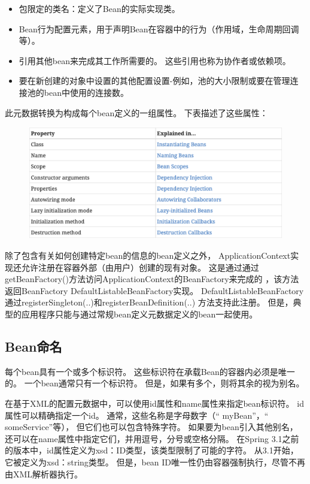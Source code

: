 \begin{itemize}
    \item 包限定的类名：定义了Bean的实际实现类。
    \item Bean行为配置元素，用于声明Bean在容器中的行为（作用域，生命周期回调等）。
    \item 引用其他bean来完成其工作所需要的。 这些引用也称为协作者或依赖项。
    \item 要在新创建的对象中设置的其他配置设置-例如，池的大小限制或要在管理连接池的bean中使用的连接数。
\end{itemize}

此元数据转换为构成每个bean定义的一组属性。 下表描述了这些属性：

\begin{figure}[ht]
    \centering
    \includegraphics[width=1\linewidth]{./Figure/IMG_bean_def.png}
\end{figure}

除了包含有关如何创建特定bean的信息的bean定义之外，
ApplicationContext实现还允许注册在容器外部（由用户）创建的现有对象。
这是通过通过getBeanFactory()方法访问ApplicationContext的BeanFactory来完成的
，该方法返回BeanFactory DefaultListableBeanFactory实现。
DefaultListableBeanFactory通过registerSingleton(..)和registerBeanDefinition(..)
方法支持此注册。 但是，典型的应用程序只能与通过常规bean定义元数据定义的bean一起使用。

\subsection{Bean命名}

每个bean具有一个或多个标识符。 这些标识符在承载Bean的容器内必须是唯一的。 
一个bean通常只有一个标识符。 
但是，如果有多个，则将其余的视为别名。

在基于XML的配置元数据中，可以使用id属性和name属性来指定bean标识符。
id属性可以精确指定一个id。 
通常，这些名称是字母数字（“ myBean”，“ someService”等），
但它们也可以包含特殊字符。 如果要为bean引入其他别名，
还可以在name属性中指定它们，并用逗号，分号或空格分隔。 
在Spring 3.1之前的版本中，id属性定义为xsd：ID类型，该类型限制了可能的字符。
从3.1开始，它被定义为xsd：string类型。 
但是，bean ID唯一性仍由容器强制执行，尽管不再由XML解析器执行。

